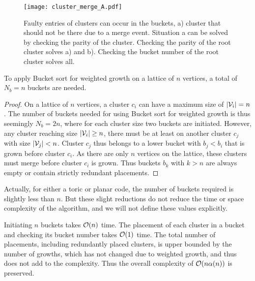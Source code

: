 \begin{figure}
  \centering
  \texttt{[image: cluster\_merge\_A.pdf]}
  \caption{Faulty entries of clusters can occur in the buckets, a) cluster that should not be there due to a merge event. Situation a can be solved by checking the parity of the cluster. Checking the parity of the root cluster solves a) and b). Checking the bucket number of the root cluster solves all.}\label{3.fig.clustermergeB}
\end{figure}


\begin{lemma}\label{lem:numbuckets}
  To apply Bucket sort for weighted growth on a lattice of $n$ vertices, a total of $N_b = n$ buckets are needed. 
\end{lemma}
\begin{proof}
  On a lattice of $n$ vertices, a cluster $c_i$ can have a maximum size of $|\mathcal{V}_i|=n$. The number of buckets needed for using Bucket sort for weighted growth is thus seemingly $N_b = 2n$, where for each cluster size two buckets are initiated. However, any cluster reaching size $|\mathcal{V}_i|\geq n$, there must be at least on another cluster $c_j$ with size $|\mathcal{V}_j|<n$. Cluster $c_j$ thus belongs to a lower bucket with $b_j < b_i$ that is grown before cluster $c_i$. As there are only $n$ vertices on the lattice, these clusters must merge before cluster $c_i$ is grown. Thus buckets $b_k$ with $k>n$ are always empty or contain strictly redundant placements.
\end{proof}
Actually, for either a toric or planar code, the number of buckets required is slightly less than $n$. But these slight reductions do not reduce the time or space complexity of the algorithm, and we will not define these values explicitly. 

Initiating $n$ buckets takes $\mathcal{O}(n)$ time. The placement of each cluster in a bucket and checking its bucket number takes $\mathcal{O}(1)$ time. The total number of placements, including redundantly placed clusters, is upper bounded by the number of growths, which has not changed due to weighted growth, and thus does not add to the complexity. Thus the overall complexity of $\mathcal{O}(n\alpha(n))$ is preserved. 

